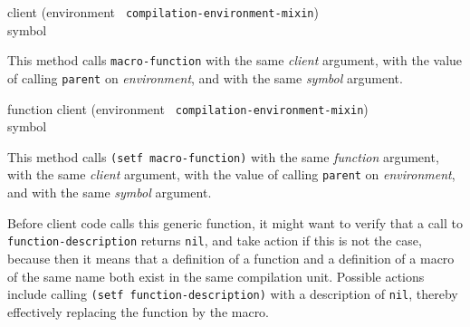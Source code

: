 {\small{} {client (environment {\tt
      compilation-environment-mixin}) \\ symbol}
}

This method calls \texttt{macro-function} with the same
\textit{client} argument, with the value of calling \texttt{parent} on
\textit{environment}, and with the same \textit{symbol} argument.

{\small{} {function client (environment {\tt
      compilation-environment-mixin}) \\ symbol}
}

This method calls \texttt{(setf macro-function)} with the same
\textit{function} argument, with the same \textit{client} argument, with
the value of calling \texttt{parent} on \textit{environment}, and with
the same \textit{symbol} argument.

Before client code calls this generic function, it might want to
verify that a call to \texttt{function-description} returns
\texttt{nil}, and take action if this is not the case, because then it
means that a definition of a function and a definition of a macro of
the same name both exist in the same compilation unit.  Possible
actions include calling \texttt{(setf function-description)} with a
description of \texttt{nil}, thereby effectively replacing the
function by the macro.
